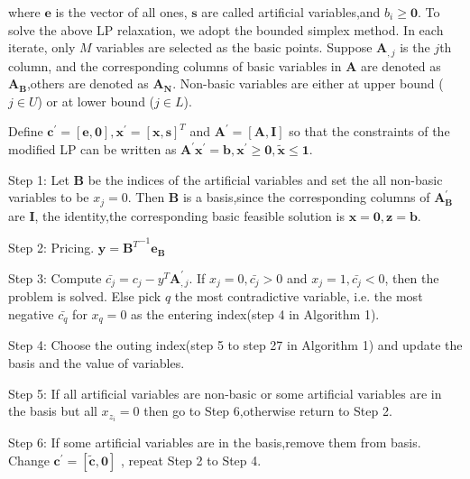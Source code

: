 \documentclass{article}
\begin{document}
where $\mathbf{e}$ is the vector of all ones, $\mathbf{s}$ are called artificial variables,and $b_{i}\geq \mathbf{0}$.
To solve the above LP relaxation, we adopt the bounded simplex method. In each iterate, only $M$ variables are selected as the basic points. Suppose $\mathbf{A}_{,j}$ is the $j$th column, and the corresponding columns of basic variables in $\mathbf{A}$ are denoted as $\mathbf{A_B}$,others are denoted as $\mathbf{A_N}$. Non-basic variables are either at upper bound ($j \in U$) or at lower bound ($j\in L$).

Define $\mathbf{c^{'}}=[\mathbf{e},\mathbf{0}], \mathbf{x}^{'} = [\mathbf{x},\mathbf{s}]^T$ and $\mathbf{A}^{'} = [\mathbf{A},\mathbf{I}]$ so that the constraints of the modified LP can be written as $\mathbf{A}^{'}\mathbf{x}^{'} = \mathbf{b}, \mathbf{x}^{'} \geq \mathbf{0},\tilde{\mathbf{x}} \leq \mathbf{1}$.

Step 1: Let $\mathbf{B}$ be the indices of the artificial variables and set the all non-basic variables to be $x_j=0$. Then $\mathbf{B}$ is a basis,since the corresponding columns of $\mathbf{A_B^{'}}$ are $\mathbf{I}$, the identity,the corresponding basic feasible solution is $\mathbf{x} = \mathbf{0}, \mathbf{z} = \mathbf{b}$.

Step 2: Pricing. $\mathbf{y} = {\mathbf{B}^T}^{-1}\mathbf{e_B}$

Step 3: Compute $\bar{c_j} = c_j - y^T\mathbf{A}_{,j}^{'}$. If $x_j = 0, \bar{c_j} > 0$ and $x_j = 1,\bar{c_j} < 0$, then the problem is solved. Else pick $q$ the most contradictive variable, i.e. the most negative $\bar{c_q}$ for $x_q = 0$ as the entering index(step 4 in Algorithm 1).

Step 4: Choose the outing index(step 5 to step 27 in Algorithm 1) and update the basis and the value of variables.

Step 5: If all artificial variables are non-basic or some artificial variables are in the basis but all $x_{z_i} = 0$ then go to Step 6,otherwise return to Step 2.

Step 6: If some artificial variables are in the basis,remove them from basis. Change $\mathbf{c^{'}}=[\tilde{\mathbf{c}},\mathbf{0}]$ , repeat Step 2 to Step 4.
\end{document}

